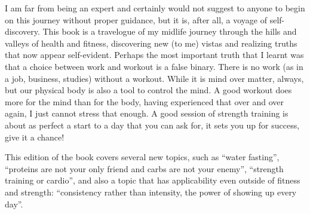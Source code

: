 \documentclass[
  oneside]{book}
\begin{document}
I am far from being an expert and certainly would not suggest to anyone to begin on this journey without proper guidance, but it is, after all, a voyage of self-discovery. This book is a travelogue of my midlife journey through the hills and valleys of health and fitness, discovering new (to me) vistas and realizing truths that now appear self-evident. Perhaps the most important truth that I learnt was that a choice between work and workout is a false binary. There is no work (as in a job, business, studies) without a workout. While it is mind over matter, always, but our physical body is also a tool to control the mind. A good workout does more for the mind than for the body, having experienced that over and over again, I just cannot stress that enough. A good session of strength training is about as perfect a start to a day that you can ask for, it sets you up for success, give it a chance!

This edition of the book covers several new topics, such as ``water fasting'', ``proteins are not your only friend and carbs are not your enemy'', ``strength training or cardio'', and also a topic that has applicability even outside of fitness and strength: ``consistency rather than intensity, the power of showing up every day''.
\end{document}
